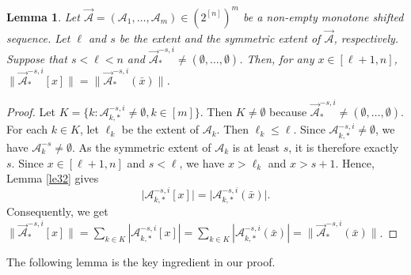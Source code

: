 \documentclass[11pt,a4paper]{article}
\newtheorem{lemma}[theorem]{Lemma}
\begin{document}
\begin{lemma}\label{le33}
Let $\vec{\mathcal{A}} = (\mathcal{A}_1, \ldots, \mathcal{A}_m) \in (2^{[n]})^{m}$ be  a non-empty  monotone shifted  sequence. Let $\ell$ and   $s$ be  the extent and the symmetric extent of $\vec{\mathcal{A}}$, respectively. Suppose that $s<\ell<n$ and $\vec{\mathcal{A}}_*^{-s,i}\neq(\emptyset, \ldots, \emptyset)$.  Then, for any $x\in [\ell+1,n]$,   $\|\vec{\mathcal{A}}_*^{-s,i}[x]\|=\|\vec{\mathcal{A}}_*^{-s,i}(\bar{x})\|$.
\end{lemma} 
\begin{proof}
Let $K=\{k: \mathcal{A}_{k,*}^{-s, i}\neq \emptyset, k\in[m]\}$. Then $K\neq \emptyset$ because $\vec{\mathcal{A}}_*^{-s,i}\neq(\emptyset, \ldots, \emptyset)$. 
For each $k\in K$, let $\ell_k$ be the extent of $\mathcal A_k$.
Then $\ell_k\le\ell$. 
Since $\mathcal A_{k,*}^{-s,i}\ne\emptyset$, we have
$\mathcal A_k^{-s}\ne\emptyset$. As the symmetric extent of
$\mathcal A_k$ is at least $s$, it is therefore exactly $s$.
Since $x\in[\ell+1,n]$ and $s<\ell$, we have
$x>\ell_k$ and $x>s+1$. Hence, Lemma \ref{le32} gives
\[
\bigl|\mathcal A_{k,*}^{-s,i}[x]\bigr|
=
\bigl|\mathcal A_{k,*}^{-s,i}(\bar x)\bigr|.
\]
Consequently, we get $\|\vec{\mathcal{A}}_*^{-s,i}[x]\|=\sum_{k\in K}|\mathcal{A}_{k, *}^{-s,i}[x]|=\sum_{k\in K}|\mathcal{A}_{k, *}^{-s,i}(\bar{x})|=\|\vec{\mathcal{A}}_*^{-s,i}(\bar{x})\|$.
\end{proof}










The following lemma is the key ingredient in our proof.
\end{document}
